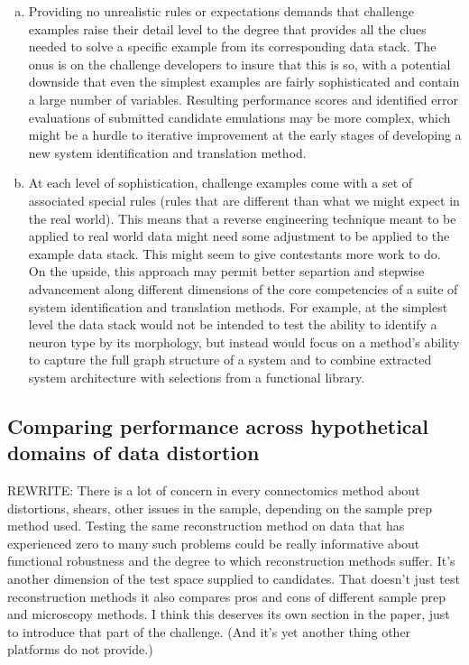 \documentclass{ldr-article}
\begin{document}
\begin{enumerate}[a)]
	\item Providing no unrealistic rules or expectations demands that challenge examples raise their detail level to the degree that provides all the clues needed to solve a specific example from its corresponding data stack. The onus is on the challenge developers to insure that this is so, with a potential downside that even the simplest examples are fairly sophisticated and contain a large number of variables. Resulting performance scores and identified error evaluations of submitted candidate emulations may be more complex, which might be a hurdle to iterative improvement at the early stages of developing a new system identification and translation method.
	
	\item At each level of sophistication, challenge examples come with a set of associated special rules (rules that are different than what we might expect in the real world). This means that a reverse engineering technique meant to be applied to real world data might need some adjustment to be applied to the example data stack. This might seem to give contestants more work to do. On the upside, this approach may permit better separtion and stepwise advancement along different dimensions of the core competencies of a suite of system identification and translation methods. For example, at the simplest level the data stack would not be intended to test the ability to identify a neuron type by its morphology, but instead would focus on a method's ability to capture the full graph structure of a system and to combine extracted system architecture with selections from a functional library.
\end{enumerate}

\subsection{Comparing performance across hypothetical domains of data distortion}

\alert{REWRITE:} There is a lot of concern in every connectomics method about distortions, shears, other issues in the sample, depending on the sample prep method used. Testing the same reconstruction method on data that has experienced zero to many such problems could be really informative about functional robustness and the degree to which reconstruction methods suffer. It's another dimension of the test space supplied to candidates. That doesn't just test reconstruction methods it also compares pros and cons of different sample prep and microscopy methods. I think this deserves its own section in the paper, just to introduce that part of the challenge. (And it's yet another thing other platforms do not provide.)
\end{document}
